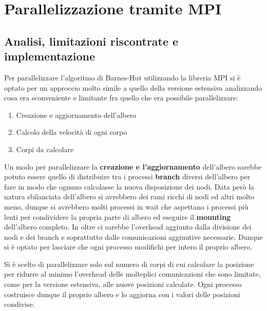 \documentclass[12pt]{report}
\begin{document}
    \newpage

    \section{Parallelizzazione tramite MPI}
    
    \subsection{Analisi, limitazioni riscontrate e implementazione}
    
    Per parallelizzare l'algoritmo di Barnes-Hut utilizzando la libreria MPI si è optato per un approccio molto simile a quello della versione estensiva analizzando cosa era sconveniente e limitante fra quello che era possibile parallelizzare:
    \begin{enumerate}
        \item Creazione e aggiornamento dell'albero
        \item Calcolo della velocità di ogni corpo
        \item Corpi da calcolare
    \end{enumerate}

    Un modo per parallelizzare la \textbf{creazione e l'aggiornamento} dell'albero sarebbe potuto essere quello di distribuire tra i processi \textbf{branch} diversi dell'albero per fare in modo che ognuno calcolasse la nuova disposizione dei nodi. Data però la natura sbilanciata dell'albero si avrebbero dei rami ricchi di nodi ed altri molto meno, dunque si avrebbero molti processi in wait che aspettano i processi più lenti per condividere la propria parte di albero ed eseguire il \textbf{mounting} dell'albero completo.
    In oltre ci sarebbe l'overhead aggiunto dalla divisione dei nodi e dei branch e soprattutto dalle comunicazioni aggiuntive necessarie. Dunque si è optato per lasciare che ogni processo modifichi per intero il proprio albero. 
    
    Si è scelto di parallelizzare solo sul numero di corpi di cui calcolare la posizione per ridurre al minimo l'overhead delle molteplici comunicazioni che sono limitate, come per la versione estensiva, alle nuove posizioni calcolate. Ogni processo costruisce dunque il proprio albero e lo aggiorna con i valori delle posizioni condivise. 
\end{document}
